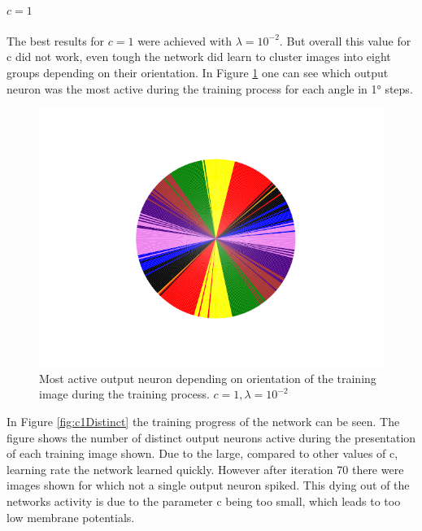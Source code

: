 \paragraph{$c = 1$}
The best results for $c = 1$ were achieved with $\lambda = 10^{-2}$. But overall this value for c did not work, even tough the network did learn to cluster images into eight groups depending on their orientation. In Figure \ref{fig:c1Pie} one can see which output neuron was the most active during the training process for each angle in 1° steps.

\begin{figure}
  \includegraphics[width=\linewidth]{figures/angleNetwork/c1Pie.png}
  \caption{Most active output neuron depending on orientation of the training image during the training process. $c = 1, \lambda = 10^{-2}$}
  \label{fig:c1Pie}
\end{figure}

In Figure \ref{fig:c1Distinct} the training progress of the network can be seen. The figure shows the number of distinct output neurons active during the presentation of each training image shown. Due to the large, compared to other values of c, learning rate the network learned quickly. However after iteration 70 there were images shown for which not a single output neuron spiked. This dying out of the networks activity is due to the parameter c being too small, which leads to too low membrane potentials.

